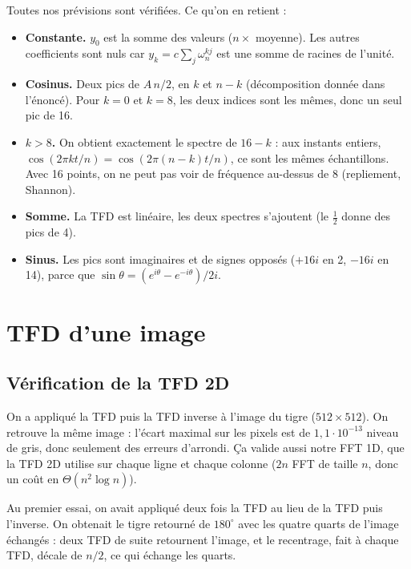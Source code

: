 \documentclass[11pt,a4paper]{article}
\begin{document}
Toutes nos prévisions sont vérifiées. Ce qu'on en retient :
\begin{itemize}
  \item \textbf{Constante.} $y_0$ est la somme des valeurs ($n \times$ moyenne). Les
        autres coefficients sont nuls car $y_k = c \sum_j \omega_n^{kj}$ est une somme
        de racines de l'unité.
  \item \textbf{Cosinus.} Deux pics de $A\,n/2$, en $k$ et $n-k$ (décomposition donnée
        dans l'énoncé). Pour $k = 0$ et $k = 8$, les deux indices sont les mêmes, donc
        un seul pic de 16.
  \item \textbf{$k > 8$.} On obtient exactement le spectre de $16-k$ : aux instants
        entiers, $\cos(2\pi k t/n) = \cos(2\pi (n-k) t/n)$, ce sont les mêmes
        échantillons. Avec 16 points, on ne peut pas voir de fréquence au-dessus de 8
        (repliement, Shannon).
  \item \textbf{Somme.} La TFD est linéaire, les deux spectres s'ajoutent (le
        $\frac12$ donne des pics de 4).
  \item \textbf{Sinus.} Les pics sont imaginaires et de signes opposés ($+16i$ en 2,
        $-16i$ en 14), parce que $\sin\theta = (e^{i\theta} - e^{-i\theta})/2i$.
\end{itemize}

\section{TFD d'une image}

\subsection{Vérification de la TFD 2D}

On a appliqué la TFD puis la TFD inverse à l'image du tigre ($512 \times 512$). On
retrouve la même image : l'écart maximal sur les pixels est de $1{,}1\cdot10^{-13}$ niveau de gris, donc
seulement des erreurs d'arrondi. Ça valide aussi notre FFT 1D, que la TFD 2D utilise sur chaque ligne et
chaque colonne ($2n$ FFT de taille $n$, donc un coût en $\Theta(n^2 \log n)$).

Au premier essai, on avait appliqué deux fois la TFD au lieu de la TFD puis
l'inverse. On obtenait le tigre retourné de $180^\circ$ avec les quatre quarts de
l'image échangés : deux TFD de suite retournent l'image, et le recentrage, fait à
chaque TFD, décale de $n/2$, ce qui échange les quarts.
\end{document}
